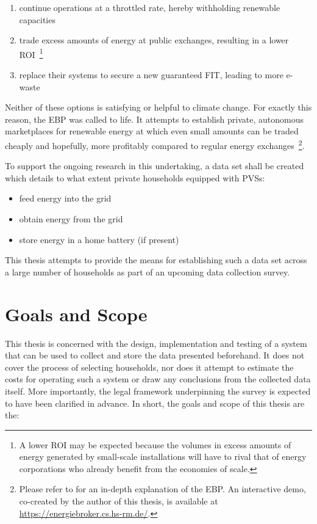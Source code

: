\begin{enumerate}[label=(\Alph*)]
  \item continue operations at a throttled rate, hereby withholding renewable capacities
  \item trade excess amounts of energy at public exchanges, resulting in a lower \acs{ROI}~\footnote{A lower \acs{ROI} may be expected because the volumes in excess amounts of energy generated by small-scale installations will have to rival that of energy corporations who already benefit from the economies of scale.}
  \item replace their systems to secure a new guaranteed \ac{FIT}, leading to more e-waste
\end{enumerate}

Neither of these options is satisfying or helpful to climate change. For exactly this reason, the \ac{EBP} was called to life. It attempts to establish private, autonomous marketplaces for renewable energy at which even small amounts can be traded cheaply and hopefully, more profitably compared to regular energy exchanges~\footnote{Please refer to \cite{stoy2019broker} for an in-depth explanation of the \ac{EBP}. An interactive demo, co-created by the author of this thesis, is available at \url{https://energiebroker.cs.hs-rm.de/}.}.

To support the ongoing research in this undertaking, a data set shall be created which details to what extent private households equipped with \acsp{PVS}:

\begin{itemize}
  \item feed energy into the grid
  \item obtain energy from the grid
  \item store energy in a home battery (if present)
\end{itemize}

This thesis attempts to provide the means for establishing such a data set across a large number of households as part of an upcoming data collection survey.


\section{Goals and Scope}
\label{sec:goals-and-scope}

This thesis is concerned with the design, implementation and testing of a system that can be used to collect and store the data presented beforehand. It does not cover the process of selecting households, nor does it attempt to estimate the costs for operating such a system or draw any conclusions from the collected data itself. More importantly, the legal framework underpinning the survey is expected to have been clarified in advance. In short, the goals and scope of this thesis are the:

